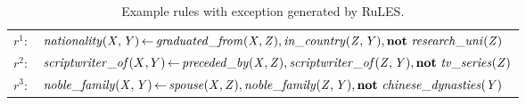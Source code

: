 

\begin{table}[t]
\centering
\small
\begin{tabular}{|cl|}
	\hline
$r^1{:}$ & $\mathit{nationality(X{,}\, Y)}\, {\leftarrow}\, \mathit{graduated\_from(X{,}\, Z)}{,}\, \mathit{in\_country(Z{,}\, Y)},
	\textbf{not}\ \mathit{research\_uni(Z)}$\\
$r^2{:}$ & $\mathit{scriptwriter\_of}(X{,}\, Y)\, {\leftarrow}\, \mathit{preceded\_by(X{,}\, Z)}{,}\, \mathit{scriptwriter\_of(Z{,}\, Y)},
\textbf{not}\ \mathit{tv\_series(Z)}$\\
$r^3{:}$ &$\mi{noble\_family(X{,}\, Y)}\, {\leftarrow}\, \mi{ spouse(X{,}\, Z)}{,}\, \mi{noble\_family(Z{,}\, Y)}{,}\,  \textbf{not}\ \mi{ chinese\_dynasties(Y)}$\\

	\hline
\end{tabular}
\caption{Example rules with exception generated by RuLES.}
\vspace*{-3mm}
\label{figure:examples}
\end{table}
